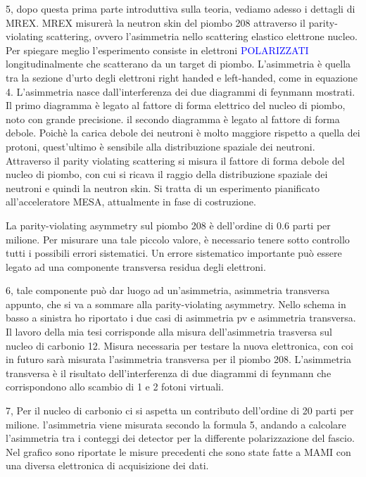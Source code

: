 \documentclass[11pt,a4paper]{article}
\begin{document}
\begin{list}{\textbf{slide}}{}
\item 5, dopo questa prima parte introduttiva sulla teoria, vediamo adesso i dettagli di MREX. MREX misurerà la neutron skin del piombo 208 attraverso il parity-violating scattering, ovvero l'asimmetria nello scattering elastico elettrone nucleo. Per spiegare meglio l'esperimento consiste in elettroni \textcolor{blue}{POLARIZZATI} longitudinalmente che scatterano da un target di piombo. L'asimmetria è quella tra la sezione d'urto degli elettroni right handed e left-handed, come in equazione 4. L'asimmetria nasce dall'interferenza dei due diagrammi di feynmann mostrati. Il primo diagramma è legato al fattore di forma elettrico del nucleo di piombo, noto con grande precisione. il secondo diagramma è legato al fattore di forma debole. Poichè la carica debole dei neutroni è molto maggiore rispetto a quella dei protoni, quest'ultimo è sensibile alla distribuzione spaziale dei neutroni. Attraverso il parity violating scattering si misura il fattore di forma debole del nucleo di piombo, con cui si ricava il raggio della distribuzione spaziale dei neutroni e quindi la neutron skin. Si tratta di un esperimento pianificato all'acceleratore MESA, attualmente in fase di costruzione.

La parity-violating asymmetry sul piombo 208 è dell'ordine di 0.6 parti per milione. Per misurare una tale piccolo valore, è necessario tenere sotto controllo tutti i possibili errori sistematici. Un errore sistematico importante può essere legato ad una componente transversa residua degli elettroni. 

\item 6, tale componente può dar luogo ad un'asimmetria, asimmetria transversa appunto, che si va a sommare alla parity-violating asymmetry. Nello schema in basso a sinistra ho riportato i due casi di asimmetria pv e asimmetria transversa. Il lavoro della mia tesi corrisponde alla misura dell'asimmetria trasversa sul nucleo di carbonio 12. Misura necessaria per testare la nuova elettronica, con coi in futuro sarà misurata l'asimmetria transversa per il piombo 208. L'asimmetria transversa è il risultato dell'interferenza di due diagrammi di feynmann che corrispondono allo scambio di 1 e 2 fotoni virtuali.

\item 7,  Per il nucleo di carbonio ci si aspetta un contributo dell'ordine di 20 parti per milione. l'asimmetria viene misurata secondo la formula 5, andando a calcolare l'asimmetria tra i conteggi dei detector per la differente polarizzazione del fascio. Nel grafico sono riportate le misure precedenti che sono state fatte a MAMI con una diversa elettronica di acquisizione dei dati.


\end{list}
\end{document}

